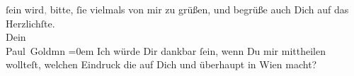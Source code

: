 \begin{ledgroupsized}[t]{13cm}
{{{               }}}\label{K_L03223-8h} ſein wird\textcolor{gray}{,} bitte, ſie vielmals von mir zu grüßen, {\pb}und begrüße auch Dich auf das Herzlichſte. {\\[\baselineskip]}Dein {\\[\baselineskip]}\spacefill\mbox{Paul Goldmn}\pend
           \leftskip=0em{}\pstart
           \noindent{}Ich würde Dir dankbar ſein, wenn Du mir mittheilen wollteſt, welchen Eindruck die
                     \label{K_L03223-9v}\label{K_L03223-9h} auf Dich
                  und überhaupt in Wien macht?\pend
           
         
         \endnumbering{}\end{ledgroupsized}  \newcommand{\dateiname}{L03223}\newcommand{\titel}{Paul Goldmann an Arthur Schnitzler, 2. [10. 1902]}\newcommand{\editorInnen}{Martin Anton Müller und Laura Untner}
      